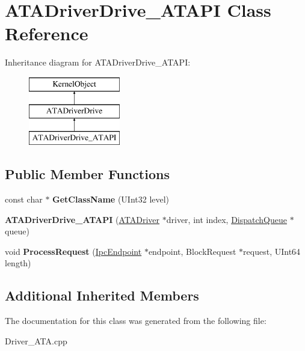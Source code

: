 \hypertarget{class_a_t_a_driver_drive___a_t_a_p_i}{}\section{A\+T\+A\+Driver\+Drive\+\_\+\+A\+T\+A\+PI Class Reference}
\label{class_a_t_a_driver_drive___a_t_a_p_i}
Inheritance diagram for A\+T\+A\+Driver\+Drive\+\_\+\+A\+T\+A\+PI\+:\begin{figure}[H]
\begin{center}
\leavevmode
\includegraphics[height=3.000000cm]{class_a_t_a_driver_drive___a_t_a_p_i}
\end{center}
\end{figure}
\subsection*{Public Member Functions}
\begin{DoxyCompactItemize}
\item 
\mbox{\label{class_a_t_a_driver_drive___a_t_a_p_i_a53892ccf58c952b1b670e6d41bcf32c8}} 
const char $\ast$ {\bfseries Get\+Class\+Name} (U\+Int32 level)
\item 
\mbox{\label{class_a_t_a_driver_drive___a_t_a_p_i_a9a12fbb0c92d9483c2dc17528e3eecf0}} 
{\bfseries A\+T\+A\+Driver\+Drive\+\_\+\+A\+T\+A\+PI} (\hyperlink{class_a_t_a_driver}{A\+T\+A\+Driver} $\ast$driver, int index, \hyperlink{class_dispatch_queue}{Dispatch\+Queue} $\ast$queue)
\item 
\mbox{\label{class_a_t_a_driver_drive___a_t_a_p_i_ae44b8c13d9be2b3b6fbbba4e29f7b3b4}} 
void {\bfseries Process\+Request} (\hyperlink{class_ipc_endpoint}{Ipc\+Endpoint} $\ast$endpoint, Block\+Request $\ast$request, U\+Int64 length)
\end{DoxyCompactItemize}
\subsection*{Additional Inherited Members}


The documentation for this class was generated from the following file\+:\begin{DoxyCompactItemize}
\item 
Driver\+\_\+\+A\+T\+A.\+cpp\end{DoxyCompactItemize}
